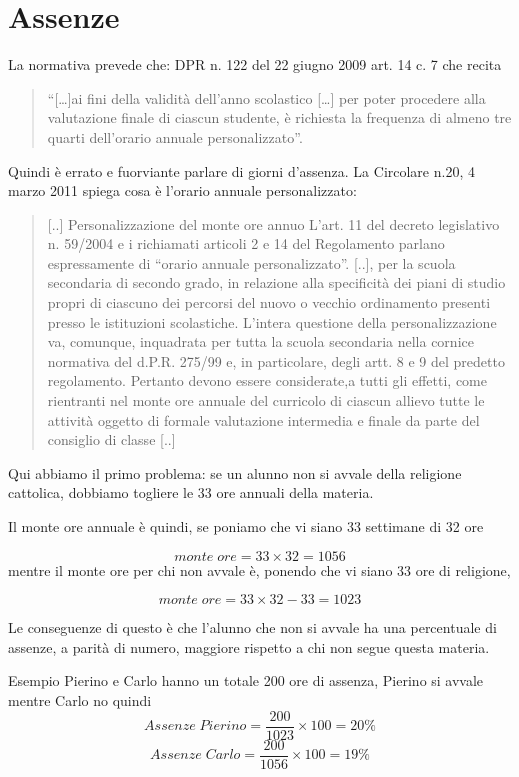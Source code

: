 \documentclass{article}
\begin{document}
\section*{Assenze}
La normativa prevede che: DPR n. 122 del 22 giugno 2009 art. 14 c. 7 che recita

\begin{quotation}

 “[…]ai fini della validità dell'anno scolastico
[…] per poter procedere alla valutazione finale di ciascun studente, 
è richiesta la frequenza di almeno tre
quarti dell'orario annuale personalizzato”.
\end{quotation}
Quindi è errato e fuorviante parlare di giorni d'assenza.
La Circolare n.20, 4 marzo 2011 spiega cosa è l'orario annuale personalizzato:

	\begin{quotation}
		[..]
	Personalizzazione del monte ore annuo
	L’art. 11 del decreto legislativo n. 59/2004 e i richiamati articoli 
	2 e 14 del Regolamento
	parlano espressamente di “orario annuale personalizzato”.
[..], per la scuola 
	secondaria 
	di secondo grado, in relazione alla
	specificità dei piani di studio propri di ciascuno dei percorsi 
	del nuovo o vecchio ordinamento
	presenti presso le istituzioni scolastiche.
	L’intera questione della personalizzazione va, comunque, inquadrata
	 per tutta la scuola secondaria nella cornice normativa del d.P.R. 275/99 e,
	 in particolare, degli artt. 8 e 9 del predetto regolamento.
	Pertanto devono essere considerate,a tutti gli effetti, 
	come rientranti nel monte ore annuale del curricolo di ciascun 
	allievo tutte le attività 
	oggetto di formale valutazione intermedia e finale da
	parte del consiglio di classe 
	[..]
	\end{quotation}
Qui abbiamo il primo problema: se un alunno non si avvale della religione cattolica, 
dobbiamo togliere le 33 ore annuali della materia.

Il monte ore annuale è quindi, se poniamo che vi siano 33 settimane di 32 ore

\[monte\; ore=33\times 32=1056\]
mentre il monte ore per chi non avvale è, ponendo che vi siano 33 ore di religione,

\[monte\; ore=33\times 32-33=1023\]

Le conseguenze di questo è che l'alunno che non si avvale ha una percentuale di assenze, a parità di numero, maggiore rispetto a chi non segue questa materia.

 Esempio Pierino e Carlo hanno un totale 200 ore di assenza, Pierino si avvale mentre Carlo no quindi
\[Assenze\; Pierino=\dfrac{200}{1023}\times 100=20\%\]
\[Assenze\; Carlo=\dfrac{200}{1056}\times 100=19\%\]
\end{document}
